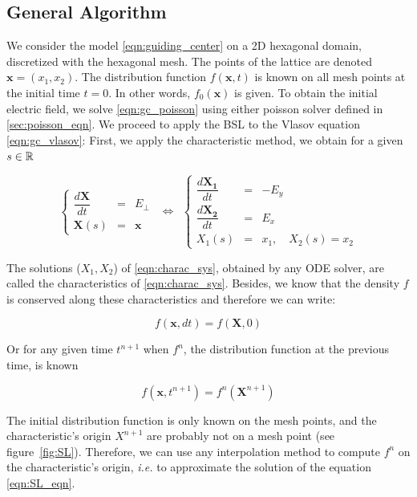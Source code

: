 \documentclass[proc]{edpsmath}
\begin{document}
\subsection{General Algorithm}
We consider the model \eqref{eqn:guiding_center} on a 2D hexagonal domain, discretized with the hexagonal mesh. The points of the lattice are denoted $\mathbf{x}=(x_1, x_2)$. The distribution function $f(\mathbf{x},t)$ is known on all mesh points at the initial time $t=0$. In other words, $f_0(\mathbf{x})$ is given. To obtain the initial electric field, we solve \eqref{eqn:gc_poisson} using either poisson solver defined in \ref{sec:poisson_eqn}. We proceed to apply the BSL to the Vlasov equation \eqref{eqn:gc_vlasov}: First, we apply the characteristic method, we obtain for a given $s \in \mathbb{R} $

\begin{equation}
	\label{eqn:charac_sys}
	\left\lbrace
	\begin{array}{lcl}
	\displaystyle \dfrac{d \mathbf{X}}{dt} &=& E_\perp\\[0.3cm]
	\displaystyle \mathbf{X}(s) &=& \mathbf{x}
	\end{array}\right.
~~\Longleftrightarrow ~~
	\left\lbrace
	\begin{array}{lcl}
	\displaystyle \dfrac{d \mathbf{X_1}}{dt} &=& -E_y\\[0.3cm]
	\displaystyle \dfrac{d \mathbf{X_2}}{dt} &=& E_x\\[0.3cm]
	\displaystyle X_1(s) &=& x_1, \quad   X_2(s) = x_2
	\end{array}\right.
\end{equation}

The solutions ($X_1, X_2$) of \eqref{eqn:charac_sys}, obtained by any ODE solver, are called the characteristics of \eqref{eqn:charac_sys}. Besides, we know that the density $f$ is conserved along these characteristics and therefore we can write:

\begin{equation}
	f(\mathbf{x}, dt) = f(\mathbf{X}, 0)
\end{equation}

Or for any given time $t^{n+1}$ when $f^n$, the distribution function at the previous time, is known

\begin{equation}
\label{eqn:SL_eqn}
	f(\mathbf{x}, t^{n+1}) = f^n(\mathbf{X}^{n+1})
\end{equation}

The initial distribution function is only known on the mesh points, and the characteristic's origin $X^{n+1}$ are probably not on a mesh point (see figure~\ref{fig:SL}). Therefore, we can use any interpolation method to compute $f^n$ on the characteristic's origin, \emph{i.e.} to approximate the solution of the equation \eqref{eqn:SL_eqn}.
\end{document}
